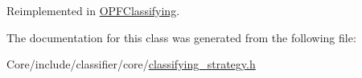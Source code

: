 Reimplemented in \hyperlink{classOPFClassifying_a04f0a0bee1c07de04302e11fa22dac57}{O\+P\+F\+Classifying}.



The documentation for this class was generated from the following file\+:\begin{DoxyCompactItemize}
\item 
Core/include/classifier/core/\hyperlink{classifying__strategy_8h}{classifying\+\_\+strategy.\+h}\end{DoxyCompactItemize}

